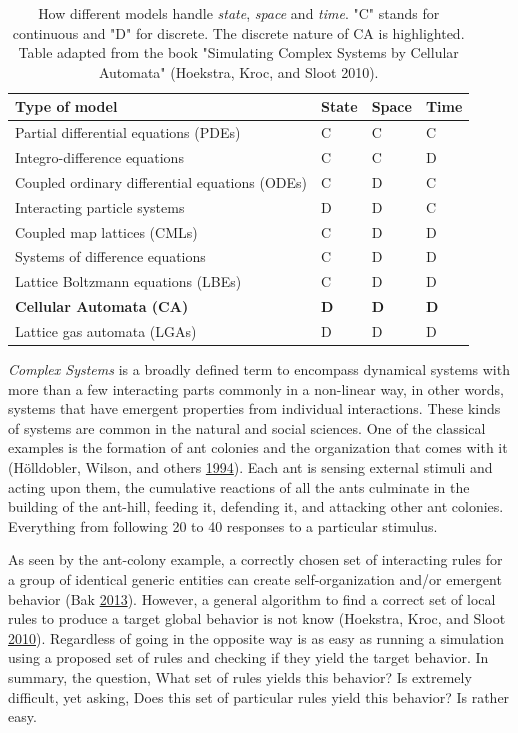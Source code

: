 \documentclass[
  12pt,
  openany]{book}
\begin{document}
\begin{table}

\caption{\label{tab:models}How different models handle \textit{state}, \textit{space} and \textit{time}. "C" stands for continuous and "D" for discrete. The discrete nature of CA is highlighted. Table adapted from the book "Simulating Complex Systems by Cellular Automata" (Hoekstra, Kroc, and Sloot 2010).}
\centering
\begin{tabular}[t]{llll}
\toprule
Type of model & State & Space & Time\\
\midrule
\rowcolor{gray!6}  Partial differential equations (PDEs) & C & C & C\\
Integro-difference equations & C & C & D\\
\rowcolor{gray!6}  Coupled ordinary differential equations (ODEs) & C & D & C\\
Interacting particle systems & D & D & C\\
\rowcolor{gray!6}  Coupled map lattices (CMLs) & C & D & D\\
\addlinespace
Systems of difference equations & C & D & D\\
\rowcolor{gray!6}  Lattice Boltzmann equations (LBEs) & C & D & D\\
\textcolor[HTML]{75C660}{\textbf{Cellular Automata (CA)}} & \textcolor[HTML]{75C660}{\textbf{D}} & \textcolor[HTML]{75C660}{\textbf{D}} & \textcolor[HTML]{75C660}{\textbf{D}}\\
\rowcolor{gray!6}  Lattice gas automata (LGAs) & D & D & D\\
\bottomrule
\end{tabular}
\end{table}

\emph{Complex Systems} is a broadly defined term to encompass dynamical systems with more than a few interacting parts commonly in a non-linear way, in other words, systems that have emergent properties from individual interactions. These kinds of systems are common in the natural and social sciences. One of the classical examples is the formation of ant colonies and the organization that comes with it (Hölldobler, Wilson, and others \protect\hyperlink{ref-holldobler1994journey}{1994}). Each ant is sensing external stimuli and acting upon them, the cumulative reactions of all the ants culminate in the building of the ant-hill, feeding it, defending it, and attacking other ant colonies. Everything from following 20 to 40 responses to a particular stimulus.

As seen by the ant-colony example, a correctly chosen set of interacting rules for a group of identical generic entities can create self-organization and/or emergent behavior (Bak \protect\hyperlink{ref-bak2013nature}{2013}). However, a general algorithm to find a correct set of local rules to produce a target global behavior is not know (Hoekstra, Kroc, and Sloot \protect\hyperlink{ref-hoekstra2010simulating}{2010}). Regardless of going in the opposite way is as easy as running a simulation using a proposed set of rules and checking if they yield the target behavior.
In summary, the question, What set of rules yields this behavior? Is extremely difficult, yet asking, Does this set of particular rules yield this behavior? Is rather easy.
\end{document}
